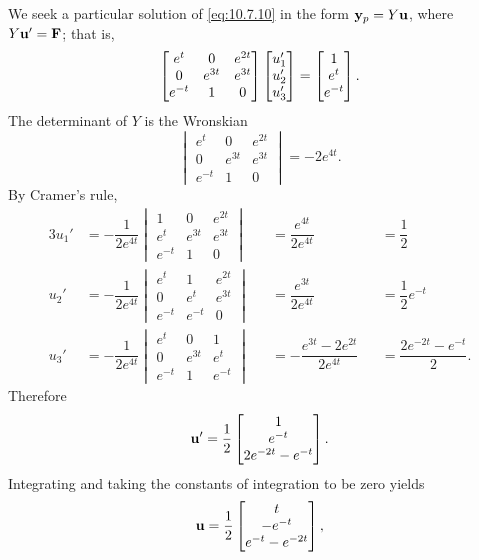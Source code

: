 \begin{solution}
We seek a particular solution of  \eqref{eq:10.7.10} in the form
$\mathbf{y}_p=Y\mathbf{u}$, where $Y\mathbf{u}'=\mathbf{F}$; that is,
\[
\begin{bmatrix}e^t&0&e^{2t}\\0&e^{3t}&e^{3t}\\e^{-t}&1&0\end{bmatrix}
\begin{bmatrix}u_1'\\u_2'\\u_3'\end{bmatrix}=
\begin{bmatrix}1\\e^t\\e^{-t}\end{bmatrix}.
\]
The determinant of $Y$  is the Wronskian
\[
\begin{vmatrix}e^t&0&e^{2t}\\0&e^{3t}&e^{3t}\\e^{-t}&1&0\end{vmatrix}=-2e^{4t}.
\]
By Cramer's rule,
\begin{alignat*}{3}
u_1'
&=-\dfrac{1}{2e^{4t}}
\begin{vmatrix}1&0&e^{2t}\\e^t&e^{3t}&e^{3t}\\e^{-t}&1&0\end{vmatrix}
&&=\dfrac{e^{4t}}{2e^{4t}}
&&=\dfrac{1}{2}\\
u_2'
&=-\dfrac{1}{2e^{4t}}
\begin{vmatrix}e^t&1&e^{2t}\\0&e^t&e^{3t}\\e^{-t}&e^{-t}&0\end{vmatrix}
&&=\dfrac{e^{3t}}{2e^{4t}}
&&=\dfrac{1}{2}e^{-t}\\
u_3'
&=-\dfrac{1}{2e^{4t}}
\begin{vmatrix}e^t&0&1\\0&e^{3t}&e^t\\e^{-t}&1&e^{-t}\end{vmatrix}
&&=-\dfrac{e^{3t}-2e^{2t}}{2e^{4t}}
&&=\dfrac{2e^{-2t}-e^{-t}}{2}.
\end{alignat*}
Therefore
\[
\mathbf{u}'=\frac{1}{2}\begin{bmatrix}1\\e^{-t}\\2e^{-2t}-e^{-t}\end{bmatrix}.
\]
Integrating  and taking the constants of integration to be zero yields
\[
\mathbf{u}=\frac{1}{2}\begin{bmatrix}t\\-e^{-t}\\e^{-t}-e^{-2t}\end{bmatrix},
\]
\end{solution}
